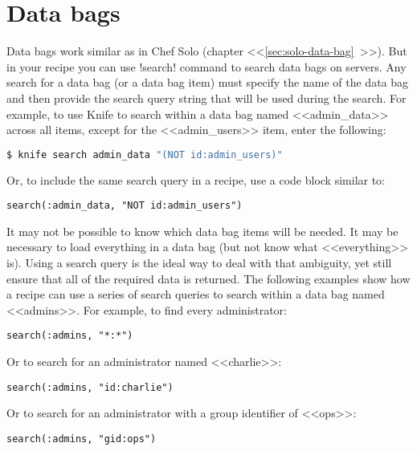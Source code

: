 \section{Data bags}
\label{sec:server-data-bags}

Data bags work similar as in Chef Solo (chapter <<\ref{sec:solo-data-bag}~>>). But in your recipe you can use \inline!search! command to search data bags on servers. Any search for a data bag (or a data bag item) must specify the name of the data bag and then provide the search query string that will be used during the search. For example, to use Knife to search within a data bag named <<admin\_data>> across all items, except for the <<admin\_users>> item, enter the following:

\begin{lstlisting}[language=Bash,label=lst:my-server-cloud-databag1]
$ knife search admin_data "(NOT id:admin_users)"
\end{lstlisting}

Or, to include the same search query in a recipe, use a code block similar to:

\begin{lstlisting}[label=lst:my-server-cloud-databag2]
search(:admin_data, "NOT id:admin_users")
\end{lstlisting}

It may not be possible to know which data bag items will be needed. It may be necessary to load everything in a data bag (but not know what <<everything>> is). Using a search query is the ideal way to deal with that ambiguity, yet still ensure that all of the required data is returned. The following examples show how a recipe can use a series of search queries to search within a data bag named <<admins>>. For example, to find every administrator:

\begin{lstlisting}[label=lst:my-server-cloud-databag3]
search(:admins, "*:*")
\end{lstlisting}

Or to search for an administrator named <<charlie>>:

\begin{lstlisting}[label=lst:my-server-cloud-databag4]
search(:admins, "id:charlie")
\end{lstlisting}

Or to search for an administrator with a group identifier of <<ops>>:

\begin{lstlisting}[label=lst:my-server-cloud-databag5]
search(:admins, "gid:ops")
\end{lstlisting}


